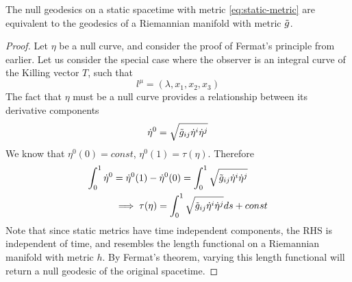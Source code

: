 \begin{corollary}[]\label{}
The null geodesics on a static spacetime with metric \cref{eq:static-metric} are equivalent to the geodesics of a Riemannian manifold with metric $\tilde{g}$.
\end{corollary}
\begin{proof}
Let $\eta$ be a null curve, and consider the proof of Fermat's principle from earlier. Let us consider the special case where the observer is an integral curve of the Killing vector $T$, such that
\begin{equation}\label{}
l^{\mu} = (\lambda, x_1, x_2, x_3)
\end{equation}
The fact that $\eta$ must be a null curve provides a relationship between its derivative components
\begin{equation}\label{}
\dot{\eta}^0 = \sqrt{\tilde{g}_{ij} \dot{\eta}^i \dot{\eta}^j}
\end{equation}
We know that $\eta^0(0) = const$, $\eta^0(1) = \tau(\eta)$. Therefore
\begin{align*}
\int_0^1 \dot{\eta}^0 &= \dot{\eta}^0(1) - \dot{\eta}^0(0) = \int_0^1 \sqrt{\tilde{g}_{ij} \dot{\eta}^i \dot{\eta}^j} \\
&\implies \tau(\eta) = \int_0^1 \sqrt{\tilde{g}_{ij} \dot{\eta}^i \dot{\eta}^j} ds + const
\end{align*}
Note that since static metrics have time independent components, the RHS is independent of time, and resembles the length functional on a Riemannian manifold with metric $h$. By Fermat's theorem, varying this length functional will return a null geodesic of the original spacetime.
\end{proof}


